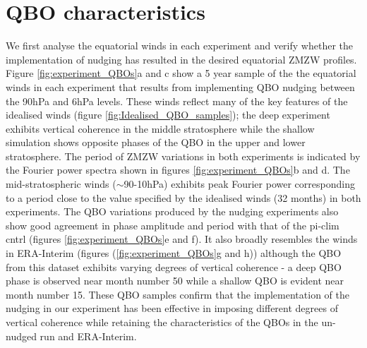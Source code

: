\section{QBO characteristics}
We first analyse the equatorial winds in each experiment and verify whether the implementation of nudging has resulted in the desired equatorial ZMZW profiles. Figure \ref{fig:experiment_QBOs}a and c show a 5 year sample of the the equatorial winds in each experiment that results from implementing QBO nudging between the 90hPa and 6hPa levels. These winds reflect many of the key features of the idealised winds (figure \ref{fig:Idealised_QBO_samples}); the deep experiment exhibits vertical coherence in the middle stratosphere while the shallow simulation shows opposite phases of the QBO in the upper and lower stratosphere. The period of ZMZW variations in both experiments is indicated by the Fourier power spectra shown in figures \ref{fig:experiment_QBOs}b and d. The mid-stratospheric winds ($\sim$90-10hPa) exhibits peak Fourier power corresponding to a period close to the value specified by the idealised winds (32 months) in both experiments. The QBO variations produced by the nudging experiments also show good agreement in phase amplitude and period with that of the pi-clim cntrl (figures \ref{fig:experiment_QBOs}e and f). It also broadly resembles the winds in ERA-Interim (figures (\ref{fig:experiment_QBOs}g and h)) although the QBO from this dataset exhibits varying degrees of vertical coherence - a deep QBO phase is observed near month number 50 while a shallow QBO is evident near month number 15. These QBO samples confirm that the implementation of the nudging in our experiment has been effective in imposing different degrees of vertical coherence while retaining the characteristics of the QBOs in the un-nudged run and ERA-Interim.


